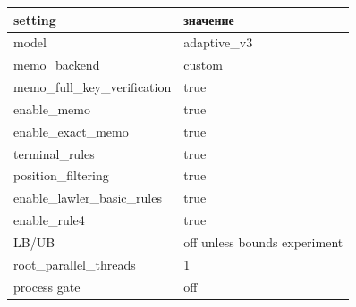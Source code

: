 \begin{tabular}{ll}
\toprule
setting & значение \\
\midrule
model & adaptive\_v3 \\
memo\_backend & custom \\
memo\_full\_key\_verification & true \\
enable\_memo & true \\
enable\_exact\_memo & true \\
terminal\_rules & true \\
position\_filtering & true \\
enable\_lawler\_basic\_rules & true \\
enable\_rule4 & true \\
LB/UB & off unless bounds experiment \\
root\_parallel\_threads & 1 \\
process gate & off \\
\bottomrule
\end{tabular}

